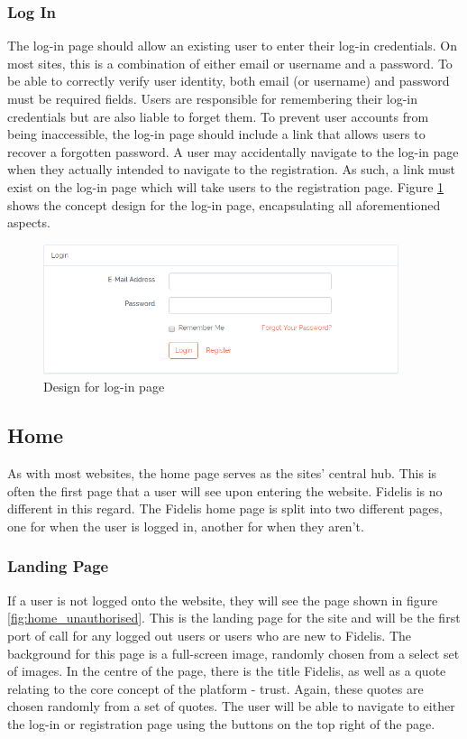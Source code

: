 \subsubsection{Log In}
The log-in page should allow an existing user to enter their log-in credentials. On most sites, this is a combination of either email or username and a password. To be able to correctly verify user identity, both email (or username) and password must be required fields. Users are responsible for remembering their log-in credentials but are also liable to forget them. To prevent user accounts from being inaccessible, the log-in page should include a link that allows users to recover a forgotten password. A user may accidentally navigate to the log-in page when they actually intended to navigate to the registration. As such, a link must exist on the log-in page which will take users to the registration page. Figure \ref{fig:login-page} shows the concept design for the log-in page, encapsulating all aforementioned aspects.

\begin{figure}[H]
\centering
\includegraphics[height=1.5in]{Images/Design/login-page}
\caption{Design for log-in page}
\label{fig:login-page}
\end{figure}

\subsection{Home}
As with most websites, the home page serves as the sites' central hub. This is often the first page that a user will see upon entering the website. Fidelis is no different in this regard. The Fidelis home page is split into two different pages, one for when the user is logged in, another for when they aren't.

\subsubsection{Landing Page}
If a user is not logged onto the website, they will see the page shown in figure \ref{fig:home_unauthorised}. This is the landing page for the site and will be the first port of call for any logged out users or users who are new to Fidelis. The background for this page is a full-screen image, randomly chosen from a select set of images. In the centre of the page, there is the title Fidelis, as well as a quote relating to the core concept of the platform - trust. Again, these quotes are chosen randomly from a set of quotes. The user will be able to navigate to either the log-in or registration page using the buttons on the top right of the page.

